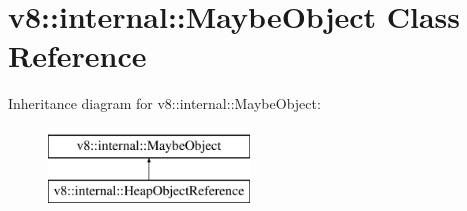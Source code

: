 \hypertarget{classv8_1_1internal_1_1MaybeObject}{}\section{v8\+:\+:internal\+:\+:Maybe\+Object Class Reference}
\label{classv8_1_1internal_1_1MaybeObject}
Inheritance diagram for v8\+:\+:internal\+:\+:Maybe\+Object\+:\begin{figure}[H]
\begin{center}
\leavevmode
\includegraphics[height=2.000000cm]{classv8_1_1internal_1_1MaybeObject}
\end{center}
\end{figure}
